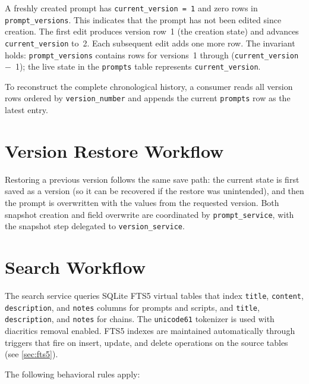 \documentclass[a4paper, 11pt, oneside]{report}
\begin{document}
A freshly created prompt has \texttt{current\_version~=~1} and zero rows
in \texttt{prompt\_versions}.  This indicates that the prompt has not been
edited since creation.  The first edit produces version row~1 (the
creation state) and advances \texttt{current\_version} to~2.  Each
subsequent edit adds one more row.  The invariant holds:
\texttt{prompt\_versions} contains rows for versions~1 through
(\texttt{current\_version}~$-$~1); the live state in the \texttt{prompts}
table represents \texttt{current\_version}.

To reconstruct the complete chronological history, a consumer reads all
version rows ordered by \texttt{version\_number} and appends the current
\texttt{prompts} row as the latest entry.

\section{Version Restore Workflow}
\label{sec:restore-workflow}

Restoring a previous version follows the same save path: the current state
is first saved as a version (so it can be recovered if the restore was
unintended), and then the prompt is overwritten with the values from the
requested version.  Both snapshot creation and field overwrite are
coordinated by \texttt{prompt\_service}, with the snapshot step delegated
to \texttt{version\_service}.

\section{Search Workflow}
\label{sec:search-workflow}

The search service queries SQLite FTS5 virtual tables that index
\texttt{title}, \texttt{content}, \texttt{description}, and \texttt{notes}
columns for prompts and scripts, and \texttt{title}, \texttt{description},
and \texttt{notes} for chains.  The \texttt{unicode61} tokenizer is used
with diacritics removal enabled.  FTS5 indexes are maintained automatically
through triggers that fire on insert, update, and delete operations on the
source tables (see \cref{sec:fts5}).

The following behavioral rules apply:
\end{document}
